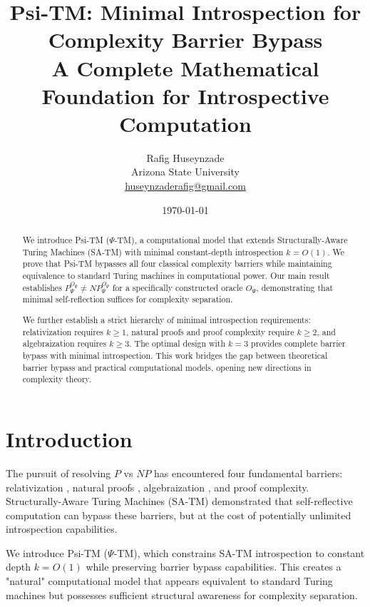 \documentclass[11pt]{article}
\title{Psi-TM: Minimal Introspection for Complexity Barrier Bypass\\
\large{A Complete Mathematical Foundation for Introspective Computation}}
\author{Rafig Huseynzade\\
Arizona State University\\
\href{mailto:huseynzaderafig@gmail.com}{huseynzaderafig@gmail.com}}
\date{\today}
\begin{document}
\maketitle

\begin{abstract}
We introduce Psi-TM ($\Psi$-TM), a computational model that extends Structurally-Aware Turing Machines (SA-TM) with minimal constant-depth introspection $k = O(1)$. We prove that Psi-TM bypasses all four classical complexity barriers while maintaining equivalence to standard Turing machines in computational power. Our main result establishes $P^{O_\Psi}_\Psi \neq NP^{O_\Psi}_\Psi$ for a specifically constructed oracle $O_\Psi$, demonstrating that minimal self-reflection suffices for complexity separation. 

We further establish a strict hierarchy of minimal introspection requirements: relativization requires $k \geq 1$, natural proofs and proof complexity require $k \geq 2$, and algebraization requires $k \geq 3$. The optimal design with $k = 3$ provides complete barrier bypass with minimal introspection. This work bridges the gap between theoretical barrier bypass and practical computational models, opening new directions in complexity theory.
\end{abstract}

\tableofcontents
\newpage

\section{Introduction}

The pursuit of resolving $P$ vs $NP$ has encountered four fundamental barriers: relativization \cite{BGS75}, natural proofs \cite{RR97}, algebraization \cite{AW09}, and proof complexity. Structurally-Aware Turing Machines (SA-TM) \cite{SA-TM} demonstrated that self-reflective computation can bypass these barriers, but at the cost of potentially unlimited introspection capabilities.

We introduce Psi-TM ($\Psi$-TM), which constrains SA-TM introspection to constant depth $k = O(1)$ while preserving barrier bypass capabilities. This creates a "natural" computational model that appears equivalent to standard Turing machines but possesses sufficient structural awareness for complexity separation.
\end{document}
